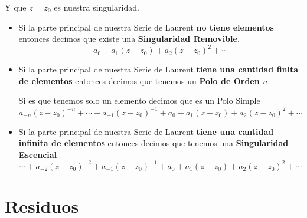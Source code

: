 \documentclass[12pt, fleqn]{report}                             %
\begin{document}
                Y que $z = z_0$ es nuestra singularidad.

                \begin{itemize}
                    \item Si la parte principal de nuestra Serie de Laurent \textbf{no tiene elementos}
                        entonces decimos que existe una \textbf{Singularidad Removible}.
                        \begin{equation*}
                            a_0 + a_1(z-z_0) + a_2(z-z_0)^2 + \cdots
                        \end{equation*}

                    \item Si la parte principal de nuestra Serie de Laurent \textbf{tiene una cantidad
                        finita de elementos} entonces decimos que tenemos un \textbf{Polo de Orden $n$}.

                        Si es que tenemos solo un elemento decimos que es un Polo Simple
                        \begin{equation*}
                            a_{-n}(z - z_0)^{-n} + \cdots + a_{-1}(z - z_0)^{-1} + 
                            a_0 + a_1(z-z_0) + a_2(z-z_0)^2 + \cdots
                        \end{equation*}

                    \item Si la parte principal de nuestra Serie de Laurent \textbf{tiene una cantidad
                        infinita de elementos} entonces decimos que tenemos una \textbf{Singularidad
                        Escencial} 
                        \begin{equation*}
                            \cdots + a_{-2}(z - z_0)^{-2} + a_{-1}(z - z_0)^{-1} +
                            a_0 + a_1(z-z_0) + a_2(z-z_0)^2 + \cdots
                        \end{equation*}
                \end{itemize}







    \chapter{Residuos} 
        \clearpage
\end{document}
